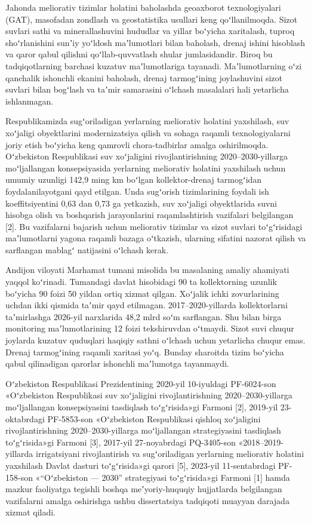\documentclass[14pt,a4paper,oneside]{extreport}
\begin{document}
Jahonda meliorativ tizimlar holatini baholashda geoaxborot
texnologiyalari (GAT), masofadan zondlash va geostatistika usullari keng
qoʻllanilmoqda. Sizot suvlari sathi va minerallashuvini hududlar va
yillar boʻyicha xaritalash, tuproq shoʻrlanishini sunʼiy yoʻldosh
maʼlumotlari bilan baholash, drenaj ishini hisoblash va qaror qabul
qilishni qoʻllab-quvvatlash shular jumlasidandir. Biroq bu
tadqiqotlarning barchasi kuzatuv maʼlumotlariga tayanadi.
Maʼlumotlarning oʻzi qanchalik ishonchli ekanini baholash, drenaj
tarmogʻining joylashuvini sizot suvlari bilan bogʻlash va taʼmir
samarasini oʻlchash masalalari hali yetarlicha ishlanmagan.

Respublikamizda sugʻoriladigan yerlarning meliorativ holatini
yaxshilash, suv xoʻjaligi obyektlarini modernizatsiya qilish va sohaga
raqamli texnologiyalarni joriy etish boʻyicha keng qamrovli
chora-tadbirlar amalga oshirilmoqda. Oʻzbekiston Respublikasi suv
xoʻjaligini rivojlantirishning 2020--2030-yillarga moʻljallangan
konsepsiyasida yerlarning meliorativ holatini yaxshilash uchun umumiy
uzunligi 142,9 ming km boʻlgan kollektor-drenaj tarmogʻidan
foydalanilayotgani qayd etilgan. Unda sugʻorish tizimlarining foydali
ish koeffitsiyentini 0,63 dan 0,73 ga yetkazish, suv xoʻjaligi
obyektlarida suvni hisobga olish va boshqarish jarayonlarini
raqamlashtirish vazifalari belgilangan {[}2{]}. Bu vazifalarni bajarish
uchun meliorativ tizimlar va sizot suvlari toʻgʻrisidagi maʼlumotlarni
yagona raqamli bazaga oʻtkazish, ularning sifatini nazorat qilish va
sarflangan mablagʻ natijasini oʻlchash kerak.

Andijon viloyati Marhamat tumani misolida bu masalaning amaliy ahamiyati
yaqqol koʻrinadi. Tumandagi davlat hisobidagi 90 ta kollektorning
uzunlik boʻyicha 90 foizi 50 yildan ortiq xizmat qilgan. Xoʻjalik ichki
zovurlarining uchdan ikki qismida taʼmir qayd etilmagan.
2017--2020-yillarda kollektorlarni taʼmirlashga 2026-yil narxlarida 48,2
mlrd soʻm sarflangan. Shu bilan birga monitoring maʼlumotlarining 12
foizi tekshiruvdan oʻtmaydi. Sizot suvi chuqur joylarda kuzatuv
quduqlari haqiqiy sathni oʻlchash uchun yetarlicha chuqur emas. Drenaj
tarmogʻining raqamli xaritasi yoʻq. Bunday sharoitda tizim boʻyicha
qabul qilinadigan qarorlar ishonchli maʼlumotga tayanmaydi.

Oʻzbekiston Respublikasi Prezidentining 2020-yil 10-iyuldagi PF-6024-son
«Oʻzbekiston Respublikasi suv xoʻjaligini rivojlantirishning
2020--2030-yillarga moʻljallangan konsepsiyasini tasdiqlash
toʻgʻrisida»gi Farmoni {[}2{]}, 2019-yil 23-oktabrdagi PF-5853-son
«Oʻzbekiston Respublikasi qishloq xoʻjaligini rivojlantirishning
2020--2030-yillarga moʻljallangan strategiyasini tasdiqlash
toʻgʻrisida»gi Farmoni {[}3{]}, 2017-yil 27-noyabrdagi PQ-3405-son
«2018--2019-yillarda irrigatsiyani rivojlantirish va sugʻoriladigan
yerlarning meliorativ holatini yaxshilash Davlat dasturi toʻgʻrisida»gi
qarori {[}5{]}, 2023-yil 11-sentabrdagi PF-158-son «``Oʻzbekiston ---
2030'' strategiyasi toʻgʻrisida»gi Farmoni {[}1{]} hamda mazkur
faoliyatga tegishli boshqa meʼyoriy-huquqiy hujjatlarda belgilangan
vazifalarni amalga oshirishga ushbu dissertatsiya tadqiqoti muayyan
darajada xizmat qiladi.
\end{document}
